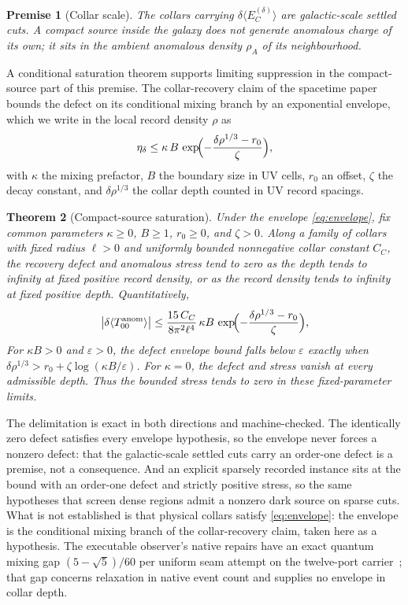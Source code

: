 \documentclass[11pt]{article}
\newtheorem{theorem}{Theorem}[section]
\newtheorem{premise}[theorem]{Premise}
\begin{document}
\begin{premise}[Collar scale]
\label{pre:scale}
The collars carrying \(\delta\langle E_C^{(\delta)}\rangle\) are
galactic-scale settled cuts. A compact source inside the galaxy does not
generate anomalous charge of its own; it sits in the ambient anomalous
density \(\rho_A\) of its neighbourhood.
\end{premise}

A conditional saturation theorem supports limiting suppression in the
compact-source part of this premise. The collar-recovery claim of the
spacetime paper~\cite{ophEinstein} bounds the
defect on its conditional mixing branch by an exponential envelope, which we
write in the local record density \(\rho\) as
\begin{equation}
\eta_\delta\le\kappa\,B\,
\exp\!\Bigl(-\frac{\delta\rho^{1/3}-r_0}{\zeta}\Bigr),
\label{eq:envelope}
\end{equation}
with \(\kappa\) the mixing prefactor, \(B\) the boundary size in UV cells,
\(r_0\) an offset, \(\zeta\) the decay constant, and \(\delta\rho^{1/3}\)
the collar depth counted in UV record spacings.

\begin{theorem}[Compact-source saturation]
\label{thm:saturation}
Under the envelope \eqref{eq:envelope}, fix common parameters
\(\kappa\geq0\), \(B\geq1\), \(r_0\geq0\), and \(\zeta>0\).
Along a family of collars with fixed radius \(\ell>0\) and uniformly bounded
nonnegative collar constant \(C_C\), the recovery defect and anomalous stress
tend to zero as the depth tends to infinity at fixed positive record density,
or as the record density tends to infinity at fixed positive depth.
Quantitatively,
\begin{equation}
\bigl|\delta\langle T_{00}^{\rm anom}\rangle\bigr|
\le\frac{15\,C_C}{8\pi^2\ell^4}\,\kappa B\,
\exp\!\Bigl(-\frac{\delta\rho^{1/3}-r_0}{\zeta}\Bigr),
\label{eq:rate}
\end{equation}
For \(\kappa B>0\) and \(\varepsilon>0\), the defect envelope bound falls
below \(\varepsilon\) exactly when
\(\delta\rho^{1/3}>r_0+\zeta\log(\kappa B/\varepsilon)\).
For \(\kappa=0\), the defect and stress vanish at every admissible depth.
Thus the bounded stress tends to zero in these fixed-parameter limits.
\end{theorem}

The delimitation is exact in both directions and machine-checked. The
identically zero defect satisfies every envelope hypothesis, so the envelope
never forces a nonzero defect: that the galactic-scale settled cuts carry an
order-one defect is a premise, not a consequence. And an explicit sparsely
recorded instance sits at the bound with an order-one defect and strictly
positive stress, so the same hypotheses that screen dense regions admit a
nonzero dark source on sparse cuts. What is not established is that physical
collars satisfy \eqref{eq:envelope}: the envelope is the conditional mixing
branch of the collar-recovery claim, taken here as a hypothesis. The
executable observer's native repairs have an exact quantum mixing gap
\((5-\sqrt5)/60\) per uniform seam attempt on the twelve-port
carrier~\cite{ophmixing}; that gap concerns relaxation in native event count
and supplies no envelope in collar depth.
\end{document}
